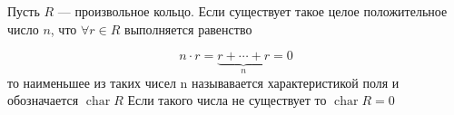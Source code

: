 \begin{definition}
	Пусть $R$ — произвольное кольцо. Если существует такое целое положительное число $n$, что $\forall r\in R$ выполняется равенство
	
	$$
	n\cdot r=\underbrace{r+\cdots +r}_{n} = 0
	$$
	то наименьшее из таких чисел n называвается характеристикой поля и обозначается $ {\mathop  {{\mathrm  {char}}}}R$
	Если такого числа не существует то $ {\mathop  {{\mathrm  {char}}}}R = 0$
\end{definition}